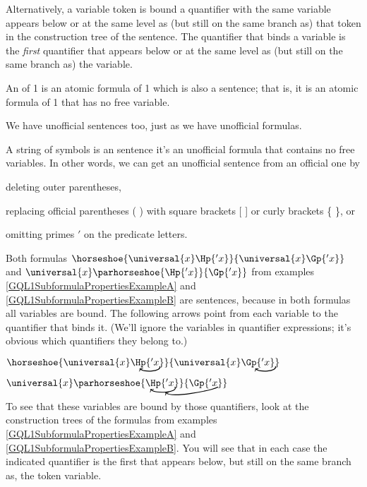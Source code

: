 Alternatively, a variable token is bound \Iff a quantifier with the same variable appears below or at the same level as (but still on the same branch as) that token in the construction tree of the sentence. 
The quantifier that binds a variable is the \emph{first} quantifier that appears below or at the same level as (but still on the same branch as) the variable. 
\begin{majorILnc}{}
An   of \GQL{}1 is an atomic formula of \GQL{}1 which is also a sentence; that is, it is an atomic formula of \GQL{}1 that has no free variable.
\end{majorILnc}
\noindent{}We have unofficial sentences too, just as we have unofficial formulas.
\begin{majorILnc}{}
A string of symbols is an  sentence \Iff it's an unofficial formula that contains no free variables. In other words, we can get an unofficial sentence from an official one by
\begin{cenumerate}
\item deleting outer parentheses,
\item replacing official parentheses ( ) with square brackets [ ] or curly brackets \{ \}, or
\item omitting primes $'$ on the predicate letters.
\end{cenumerate}
\end{majorILnc}
\begin{majorILnc}{}
Both formulas $\horseshoe{\universal{\variable{x}}\Hp{'\variable{x}}}{\universal{\variable{x}}\Gp{'\variable{x}}}$ and $\universal{\variable{x}}\parhorseshoe{\Hp{'\variable{x}}}{\Gp{'\variable{x}}}$ from examples \ref{GQL1SubformulaPropertiesExampleA} and \ref{GQL1SubformulaPropertiesExampleB} are sentences, because in both formulas all variables are bound.
The following arrows point from each variable to the quantifier that binds it.  (We'll ignore the variables in quantifier expressions; it's obvious which quantifiers they belong to.)
\begin{cenumerate}
\item $\horseshoe{\universal{\variable{x}}\Hp{'\variable{x}}\NextLineRef[black, distance=6, out=-70, in=-50]}{\universal{\variable{x}}\Gp{'\variable{x}}}\NextLineRef[black, distance=6, out=-70, in=-50]$
\item $\universal{\variable{x}}\parhorseshoe{\Hp{'\variable{x}}\NextLineRefJ[black, out=-50, in=-50]}{\Gp{'\variable{x}}\NextLineRefB[black, distance=9, out=205, in=315]}$
\end{cenumerate}

\medskip
\noindent{}To see that these variables are bound by those quantifiers, look at the construction trees of the formulas from examples \ref{GQL1SubformulaPropertiesExampleA} and \ref{GQL1SubformulaPropertiesExampleB}. You will see that in each case the indicated quantifier is the first that appears below, but still on the same branch as, the token variable.
\end{majorILnc}
